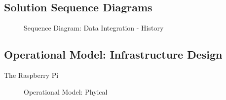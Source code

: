 \documentclass[12pt]{article} %
\begin{document}
		
	\subsection{Solution Sequence Diagrams}
	
		\begin{figure}[H] %
			\caption{Sequence Diagram: Data Integration - History}
			\label{fig:speciation}
		\end{figure}
	

	\subsection{Operational Model: Infrastructure Design}
	
	The Raspberry Pi 
	
		\begin{figure}[H] %
			\caption{Operational Model: Phyical}
			\label{fig:speciation}
		\end{figure}
	
\end{document}

